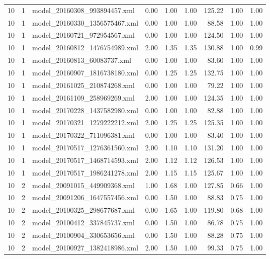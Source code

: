 \begin{table}[ht]
\begin{tabular}{rrlrrrrrr}
   10 &   1 & model\_20160308\_993894457.xml & 0.00 & 1.00 & 1.00 & 125.22 & 1.00 & 1.00 \\ 
   10 &   1 & model\_20160330\_1356575467.xml & 0.00 & 1.00 & 1.00 & 88.58 & 1.00 & 1.00 \\ 
   10 &   1 & model\_20160721\_972954567.xml & 0.00 & 1.00 & 1.00 & 124.50 & 1.00 & 1.00 \\ 
   10 &   1 & model\_20160812\_1476754989.xml & 2.00 & 1.35 & 1.35 & 130.88 & 1.00 & 0.99 \\ 
   10 &   1 & model\_20160813\_60083737.xml & 0.00 & 1.00 & 1.00 & 83.60 & 1.00 & 1.00 \\ 
   10 &   1 & model\_20160907\_1816738180.xml & 0.00 & 1.25 & 1.25 & 132.75 & 1.00 & 1.00 \\ 
   10 &   1 & model\_20161025\_210874268.xml & 0.00 & 1.00 & 1.00 & 79.22 & 1.00 & 1.00 \\ 
   10 &   1 & model\_20161109\_258969269.xml & 2.00 & 1.00 & 1.00 & 124.35 & 1.00 & 1.00 \\ 
   10 &   1 & model\_20170228\_1437582980.xml & 0.00 & 1.00 & 1.00 & 82.88 & 1.00 & 1.00 \\ 
   10 &   1 & model\_20170321\_1279222212.xml & 2.00 & 1.25 & 1.25 & 125.35 & 1.00 & 1.00 \\ 
   10 &   1 & model\_20170322\_711096381.xml & 0.00 & 1.00 & 1.00 & 83.40 & 1.00 & 1.00 \\ 
   10 &   1 & model\_20170517\_1276361560.xml & 2.00 & 1.10 & 1.10 & 131.20 & 1.00 & 1.00 \\ 
   10 &   1 & model\_20170517\_1468714593.xml & 2.00 & 1.12 & 1.12 & 126.53 & 1.00 & 1.00 \\ 
   10 &   1 & model\_20170517\_1986241278.xml & 2.00 & 1.15 & 1.15 & 125.67 & 1.00 & 1.00 \\ 
   10 &   2 & model\_20091015\_449909368.xml & 1.00 & 1.68 & 1.00 & 127.85 & 0.66 & 1.00 \\ 
   10 &   2 & model\_20091206\_1647557456.xml & 0.00 & 1.50 & 1.00 & 88.83 & 0.75 & 1.00 \\ 
   10 &   2 & model\_20100325\_298677687.xml & 0.00 & 1.65 & 1.00 & 119.80 & 0.68 & 1.00 \\ 
   10 &   2 & model\_20100412\_337845737.xml & 0.00 & 1.50 & 1.00 & 86.78 & 0.75 & 1.00 \\ 
   10 &   2 & model\_20100904\_330653656.xml & 0.00 & 1.50 & 1.00 & 88.28 & 0.75 & 1.00 \\ 
   10 &   2 & model\_20100927\_1382418986.xml & 2.00 & 1.50 & 1.00 & 99.33 & 0.75 & 1.00 \\ 

\end{tabular}
\end{table}
